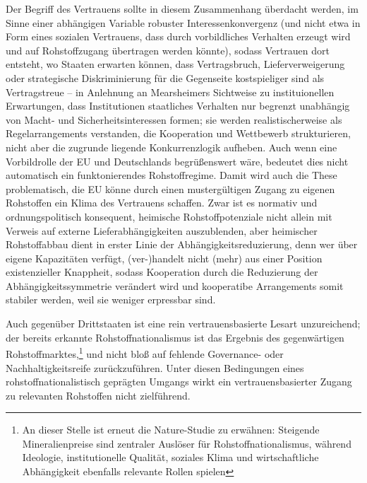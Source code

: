 \documentclass[12pt,a4paper,oneside]{book} %
\begin{document}
{Der Begriff des Vertrauens sollte in diesem Zusammenhang überdacht werden, im Sinne einer abhängigen Variable robuster Interessenkonvergenz (und nicht etwa in Form eines sozialen Vertrauens, dass durch vorbildliches Verhalten erzeugt wird und auf Rohstoffzugang übertragen werden könnte), sodass Vertrauen dort entsteht, wo Staaten erwarten können, dass Vertragsbruch, Lieferverweigerung oder strategische Diskriminierung für die Gegenseite kostspieliger sind als Vertragstreue -- in Anlehnung an Mearsheimers Sichtweise zu instituionellen Erwartungen, dass Institutionen staatliches Verhalten nur begrenzt unabhängig von Macht- und Sicherheitsinteressen formen;\autocite{The False Promise of International Institutions John J. Mearsheimer} sie werden realistischerweise als Regelarrangements verstanden, die Kooperation und Wettbewerb strukturieren, nicht aber die zugrunde liegende Konkurrenzlogik aufheben. Auch wenn eine Vorbildrolle der EU und Deutschlands begrüßenswert wäre, bedeutet dies nicht automatisch ein funktonierendes Rohstoffregime. Damit wird auch die These problematisch, die EU könne durch einen mustergültigen Zugang zu eigenen Rohstoffen ein Klima des Vertrauens schaffen. Zwar ist es normativ und ordnungspolitisch konsequent, heimische Rohstoffpotenziale nicht allein mit Verweis auf externe Lieferabhängigkeiten auszublenden, aber heimischer Rohstoffabbau dient in erster Linie der Abhängigkeitsreduzierung, denn wer über eigene Kapazitäten verfügt, (ver-)handelt nicht (mehr) aus einer Position existenzieller Knappheit, sodass Kooperation durch die Reduzierung der Abhängigkeitssymmetrie verändert wird und kooperatibe Arrangements somit stabiler werden, weil sie weniger erpressbar sind.

Auch gegenüber Drittstaaten ist eine rein vertrauensbasierte Lesart unzureichend; der bereits erkannte Rohstoffnationalismus ist das Ergebnis des gegenwärtigen Rohstoffmarktes,\footnote{An dieser Stelle ist erneut die Nature-Studie zu erwähnen: Steigende Mineralienpreise sind zentraler Auslöser für Rohstoffnationalismus, während Ideologie, institutionelle Qualität, soziales Klima und wirtschaftliche Abhängigkeit ebenfalls relevante Rollen spielen} und nicht bloß auf fehlende Governance- oder Nachhaltigkeitsreife zurückzuführen. Unter diesen Bedingungen eines rohstoffnationalistisch geprägten Umgangs wirkt ein vertrauensbasierter Zugang zu relevanten Rohstoffen nicht zielführend.

}
\end{document}
